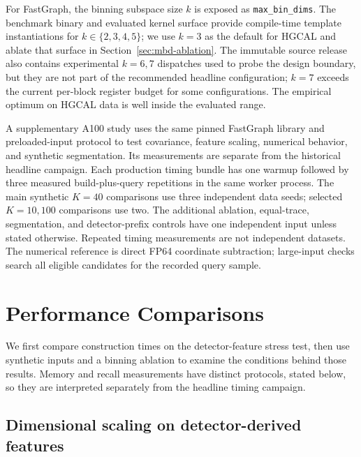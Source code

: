 \documentclass[final,3p,11pt]{elsarticle}
\newcommand{\mbdPCAdefault}{3}
\begin{document}
For FastGraph, the binning subspace size $k$ is exposed as
\texttt{max\_bin\_dims}. The benchmark binary and evaluated kernel surface
provide compile-time template instantiations for $k \in \{2,3,4,5\}$; we
use $k=\mbdPCAdefault$ as the default for HGCAL and ablate that surface in
Section~\ref{sec:mbd-ablation}. The immutable source release also contains
experimental $k=6,7$ dispatches used to probe the design boundary, but they
are not part of the recommended headline configuration; $k=7$ exceeds the
current per-block register budget for some configurations. The empirical
optimum on HGCAL data is well inside the evaluated range.

A supplementary A100 study uses the same pinned FastGraph library and
preloaded-input protocol to test covariance, feature scaling, numerical
behavior, and synthetic segmentation. Its measurements are separate from
the historical headline campaign. Each production timing bundle has one
warmup followed by three measured build-plus-query repetitions in the same
worker process. The main synthetic $K{=}40$ comparisons use three independent
data seeds; selected $K{=}10,100$ comparisons use two. The additional
ablation, equal-trace, segmentation, and detector-prefix controls have one
independent input unless stated otherwise. Repeated timing measurements
are not independent datasets. The numerical reference is direct FP64
coordinate subtraction; large-input checks search all eligible candidates
for the recorded query sample.

\section{Performance Comparisons}

We first compare construction times on the detector-feature stress test,
then use synthetic inputs and a binning ablation to examine the conditions
behind those results. Memory and recall measurements have distinct
protocols, stated below, so they are interpreted separately from the
headline timing campaign.

\subsection{Dimensional scaling on detector-derived features}
\label{sec:headline}
\end{document}
